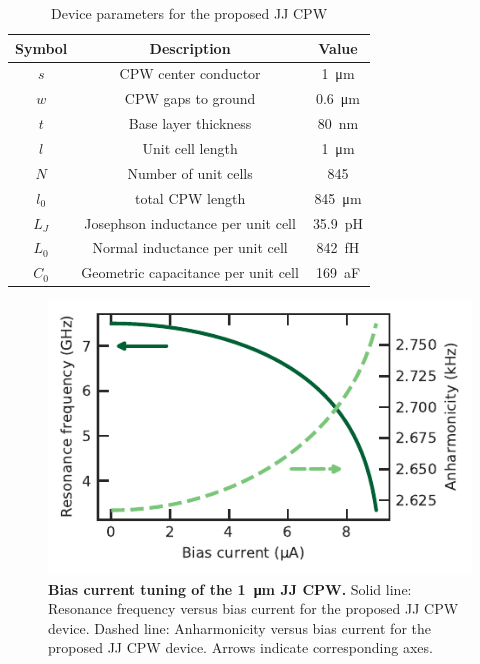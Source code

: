 \begin{table}
	\caption{Device parameters for the proposed JJ CPW\label{tab:arraygeometry}}
	\begin{tabular}{ccc}
		\hline \hline
		Symbol       & Description                           & Value                            \\
		\hline
		$s$          & CPW center conductor                  & \SI{1}{\micro\meter}            \\
		$w$          & CPW gaps to ground                    & \SI{0.6}{\micro\meter}             \\
		$t$          & Base layer thickness                  & \SI{80}{\nano\meter}             \\
		$l$          & Unit cell length                  & \SI{1}{\micro\meter}             \\
		$N$          & Number of unit cells                 & 845             \\
		$l_0$        & total CPW length   & \SI{845}{\micro\meter}          \\
		$L_J$ & Josephson inductance per unit cell         & \SI{35.9}{\pico\henry} \\
		$L_0$ & Normal inductance per unit cell         & \SI{842}{\femto\henry} \\
		$C_0$ & Geometric capacitance per unit cell      & \SI{169}{\atto\farad}  \\
		\hline\hline
	\end{tabular}
\end{table}

\begin{figure}
	\centering
	\includegraphics[width=.5\linewidth]{chapter-currentdetection/figures/SM_JJarrayCPW_vs_I}
	\caption{
		\textbf{Bias current tuning of the \SI{1}{\micro\meter} JJ CPW.}
		Solid line: Resonance frequency versus bias current for the proposed JJ CPW device.
		Dashed line: Anharmonicity versus bias current for the proposed JJ CPW device.
		Arrows indicate corresponding axes.
	}
	\label{fig:JJCPW-anh}
\end{figure}

